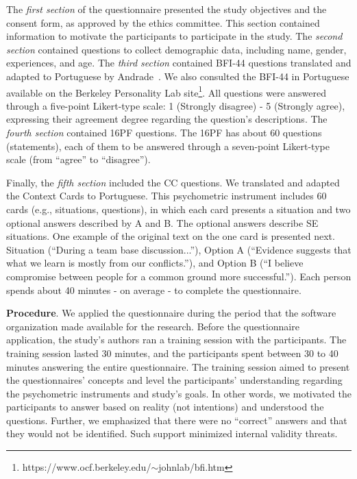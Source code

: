 The \textit{first section} of the questionnaire presented the study objectives and the consent form, as approved by the ethics committee. This section contained information to motivate the participants to participate in the study. The \textit{second section} contained questions to collect demographic data, including name, gender, experiences, and age. The \textit{third section} contained BFI-44 questions translated and adapted to Portuguese by Andrade~\cite{andrade2008evidencias}. We also consulted the BFI-44 in Portuguese available on the Berkeley Personality Lab site\footnote[2]{https://www.ocf.berkeley.edu/$\sim$johnlab/bfi.htm}. All questions were answered through a five-point Likert-type scale: 1 (Strongly disagree) - 5 (Strongly agree), expressing their agreement degree regarding the question's descriptions. The \textit{fourth section} contained 16PF questions. The 16PF has about 60 questions (statements), each of them to be answered through a seven-point Likert-type scale (from ``agree'' to ``disagree''). 

Finally, the \textit{fifth section} included the CC questions. We translated and adapted the Context Cards to Portuguese. This psychometric instrument includes 60 cards (e.g., situations, questions), in which each card presents a situation and two optional answers described by A and B. The optional answers describe SE situations. One example of the original text on the one card is presented next. Situation (``During a team base discussion...''), Option A (``Evidence suggests that what we learn is mostly from our conflicts.''), and Option B (``I believe compromise between people for a common ground more successful.''). Each person spends about 40 minutes - on average - to complete the questionnaire.

\textbf{Procedure}. We applied the questionnaire during the period that the software organization made available for the research. Before the questionnaire application, the study's authors ran a training session with the participants. The training session lasted 30 minutes, and the participants spent between 30 to 40 minutes answering the entire questionnaire. The training session aimed to present the questionnaires' concepts and level the participants' understanding regarding the psychometric instruments and study's goals. In other words, we motivated the participants to answer based on reality (not intentions) and understood the questions. Further, we emphasized that there were no ``correct'' answers and that they would not be identified. Such support minimized internal validity threats. 

